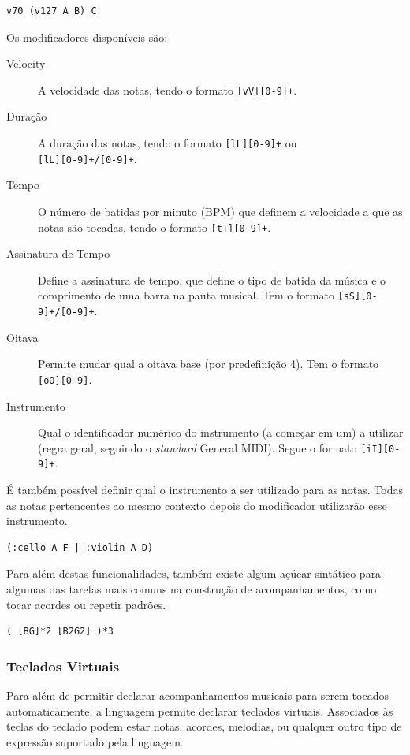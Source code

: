 \begin{lstlisting}
v70 (v127 A B) C
\end{lstlisting}

Os modificadores disponíveis são:
\begin{description}
\item[Velocity] A velocidade das notas, tendo o formato \texttt{[vV][0-9]+}.
\item[Duração] A duração das notas, tendo o formato \texttt{[lL][0-9]+} ou \\ \texttt{[lL][0-9]+/[0-9]+}.
\item[Tempo] O número de batidas por minuto (BPM) que definem a velocidade a que as notas são tocadas, tendo o formato \texttt{[tT][0-9]+}.
\item[Assinatura de Tempo] Define a assinatura de tempo, que define o tipo de batida da música e o comprimento de uma barra na pauta musical. Tem o formato \texttt{[sS][0-9]+/[0-9]+}.
\item[Oitava] Permite mudar qual a oitava base (por predefinição 4). Tem o formato \texttt{[oO][0-9]}.
\item[Instrumento] Qual o identificador numérico do instrumento (a começar em um) a utilizar (regra geral, seguindo o \textit{standard} General MIDI). Segue o formato \texttt{[iI][0-9]+}.
\end{description}

É também possível definir qual o instrumento a ser utilizado para as notas. Todas as notas pertencentes ao mesmo contexto depois do modificador utilizarão esse instrumento.

\begin{lstlisting}
(:cello A F | :violin A D)
\end{lstlisting}

Para além destas funcionalidades, também existe algum açúcar sintático para algumas das tarefas mais comuns na construção de acompanhamentos, como tocar acordes ou repetir padrões.

\begin{lstlisting}
( [BG]*2 [B2G2] )*3
\end{lstlisting}

\subsubsection{Teclados Virtuais}
Para além de permitir declarar acompanhamentos musicais para serem tocados automaticamente, a linguagem permite declarar teclados virtuais. Associados às teclas do teclado podem estar notas, acordes, melodias, ou qualquer outro tipo de expressão suportado pela linguagem.



